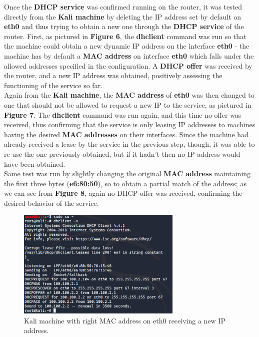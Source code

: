 Once the \textbf{DHCP service} was confirmed running on the router, it was tested directly from the \textbf{Kali machine} by deleting the IP address set by default on \textbf{eth0} and thus trying to obtain a new one through the \textbf{DHCP service} of the router. First, as pictured in \textbf{Figure 6}, the \textbf{dhclient} command was run so that the machine could obtain a new dynamic IP address on the interface \textbf{eth0} - the machine has by default a \textbf{MAC address} on interface \textbf{eth0} which falls under the allowed addresses specified in the configuration. A \textbf{DHCP offer} was received by the router, and a new IP address was obtained, positively assessing the functioning of the service so far.\\
Again from the \textbf{Kali machine}, the \textbf{MAC address} of \textbf{eth0} was then changed to one that should not be allowed to request a new IP to the service, as pictured in \textbf{Figure 7}. The \textbf{dhclient} command was run again, and this time no offer was received, thus confirming that the service is only leasing IP addresses to machines having the desired \textbf{MAC addresses} on their interfaces. Since the machine had already received a lease by the service in the previous step, though, it was able to re-use the one previously obtained, but if it hadn't then no IP address would have been obtained.\\
Same test was run by slightly changing the original \textbf{MAC address} maintaining the first three bytes (\textbf{e6:80:50}), so to obtain a partial match of the address; as we can see from \textbf{Figure 8}, again no DHCP offer was received, confirming the desired behavior of the service.

\begin{figure}[htpb]
\centering
\includegraphics[width=0.7\textwidth]{dhcp_kali_macOk.png}
\caption[a]{Kali machine with right MAC address on eth0 receiving a new IP address.}\label{fig:6}
\end{figure}

